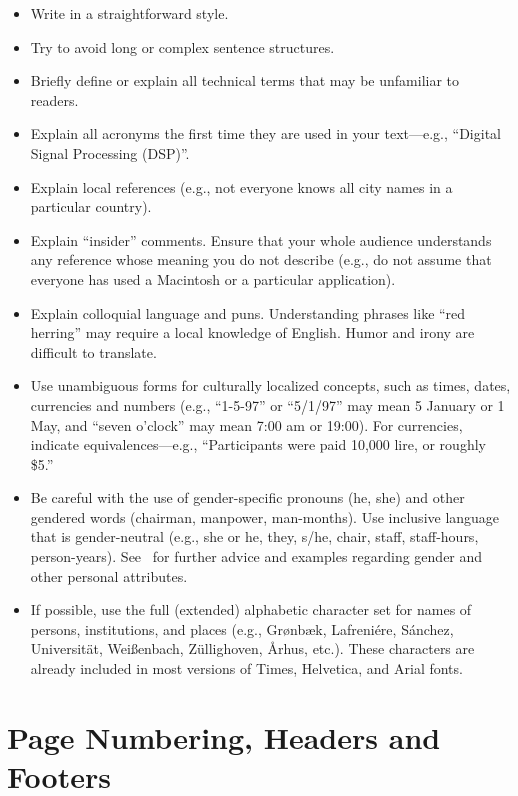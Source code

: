 \documentclass{sigchi-alternate}
\begin{document}
\begin{itemize}
\item Write in a straightforward style.
\item Try to avoid long or complex sentence structures.
\item Briefly define or explain all technical terms that may be
  unfamiliar to readers.
\item Explain all acronyms the first time they are used in your text---e.g.,
``Digital Signal Processing (DSP)''.
\item Explain local references (e.g., not everyone knows all city
  names in a particular country).
\item Explain ``insider'' comments. Ensure that your whole audience
  understands any reference whose meaning you do not describe (e.g.,
  do not assume that everyone has used a Macintosh or a particular
  application).
\item Explain colloquial language and puns. Understanding phrases like
  ``red herring'' may require a local knowledge of English.  Humor and
  irony are difficult to translate.
\item Use unambiguous forms for culturally localized concepts, such as
  times, dates, currencies and numbers (e.g., ``1-5-97'' or ``5/1/97''
  may mean 5 January or 1 May, and ``seven o'clock'' may mean 7:00 am or
  19:00).  For currencies, indicate equivalences---e.g., ``Participants
  were paid 10,000 lire, or roughly \$5.''
\item Be careful with the use of gender-specific pronouns (he, she)
  and other gendered words (chairman, manpower, man-months). Use
  inclusive language that is gender-neutral (e.g., she or he, they,
  s/he, chair, staff, staff-hours,
  person-years). See~\cite{Schwartz:1995:GBF} for further advice and
  examples regarding gender and other personal attributes.
\item If possible, use the full (extended) alphabetic character set
  for names of persons, institutions, and places (e.g.,
  Gr{\o}nb{\ae}k, Lafreni\'ere, S\'anchez, Universit{\"a}t,
  Wei{\ss}enbach, Z{\"u}llighoven, \r{A}rhus, etc.).  These characters
  are already included in most versions of Times, Helvetica, and Arial
  fonts.
\end{itemize}

\section{Page Numbering, Headers and Footers}
\end{document}

